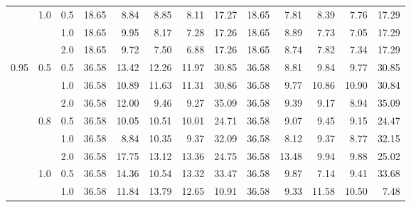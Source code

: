 \documentclass{article}
\begin{document}
{\begin{tabular}{lllrrrrrrrrrr}
          & 1.0 & 0.5 &   18.65 &        8.84 &                  8.85 &                     8.11 &          17.27 &   18.65 &        7.81 &                  8.39 &                     7.76 &          17.29 \\
          &     & 1.0 &   18.65 &        9.95 &                  8.17 &                     7.28 &          17.26 &   18.65 &        8.89 &                  7.73 &                     7.05 &          17.29 \\
          &     & 2.0 &   18.65 &        9.72 &                  7.50 &                     6.88 &          17.26 &   18.65 &        8.74 &                  7.82 &                     7.34 &          17.29 \\
     0.95 & 0.5 & 0.5 &   36.58 &       13.42 &                 12.26 &                    11.97 &          30.85 &   36.58 &        8.81 &                  9.84 &                     9.77 &          30.85 \\
          &     & 1.0 &   36.58 &       10.89 &                 11.63 &                    11.31 &          30.86 &   36.58 &        9.77 &                 10.86 &                    10.90 &          30.84 \\
          &     & 2.0 &   36.58 &       12.00 &                  9.46 &                     9.27 &          35.09 &   36.58 &        9.39 &                  9.17 &                     8.94 &          35.09 \\
          & 0.8 & 0.5 &   36.58 &       10.05 &                 10.51 &                    10.01 &          24.71 &   36.58 &        9.07 &                  9.45 &                     9.15 &          24.47 \\
          &     & 1.0 &   36.58 &        8.84 &                 10.35 &                     9.37 &          32.09 &   36.58 &        8.12 &                  9.37 &                     8.77 &          32.15 \\
          &     & 2.0 &   36.58 &       17.75 &                 13.12 &                    13.36 &          24.75 &   36.58 &       13.48 &                  9.94 &                     9.88 &          25.02 \\
          & 1.0 & 0.5 &   36.58 &       14.36 &                 10.54 &                    13.32 &          33.47 &   36.58 &        9.87 &                  7.14 &                     9.41 &          33.68 \\
          &     & 1.0 &   36.58 &       11.84 &                 13.79 &                    12.65 &          10.91 &   36.58 &        9.33 &                 11.58 &                    10.50 &           7.48 \\

\end{tabular}}
\end{document}
